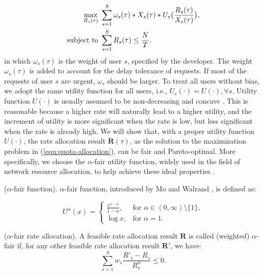\begin{align}\label{equ:quota-allocation}
\vspace{-0.5cm}
\max\limits_{R_s(\tau)}~ & \sum_{s=1}^{S} \omega_s(\tau)*X_s(\tau) * U_s\big(\frac{R_s(\tau)}{X_s(\tau)}\big),\nonumber\\
	\textrm{subject to } & \sum_{s=1}^{S}R_s(\tau) \le \frac{N}{T}.
	\end{align}
in which $\omega_s(\tau)$ is the weight of user $s$, specified by the developer. The weight $\omega_s(\tau)$ is added to account for the delay tolerance of requests. If most of the requests of user $s$ are urgent, $\omega_s$ should be larger. To treat all users without bias, we adopt the same utility function for all users, i.e., $U_s(\cdot) = U(\cdot), \forall s$. Utility function $U(\cdot)$ is usually assumed to be non-decreasing and concave \cite{yi2008stochastic}. This is reasonable because a higher rate will naturally lead to a higher utility, and the increment of utility is more significant when the rate is low, but less significant when the rate is already high. We will show that, with a proper utility function $U(\cdot)$, the rate allocation result $\pmb{R}(\tau)$, as the solution to the maximization problem in (\ref{equ:quota-allocation}), can be fair and Pareto-optimal. More specifically, we choose the $\alpha$-fair utility function, widely used in the field of network resource allocation, to help achieve these ideal properties \cite{yi2008stochastic}.
	
	\begin{definition} ($\alpha$-fair function). 
		$\alpha$-fair function, introduced by Mo and Walrand \cite{mo2000fair}, is defined as:

		
		\begin{equation}\label{equ:N_w_2}
		U^{\alpha}(x) = \left\{ \begin{array}{ll}
		\frac{x^{1-\alpha}}{1-\alpha}, &\textrm{for } \alpha \in (0,\infty) \setminus \{1\},   \\
		\log x, &\textrm{for } \alpha = 1. \end{array}  \right.
		\end{equation}
		 
	\end{definition} 
	
	\begin{definition}\label{def:fairallocation}($\alpha$-fair rate allocation). 
		A feasible rate allocation result $\pmb{R}$ is called (weighted) $\alpha$-fair if, for any other feasible rate allocation result $\pmb{R}'$, we have: 
		\begin{equation}
		\sum_{s=1}^{S} w_s\frac{R'_s - R_s}{R_s^{\alpha}} \le 0. 
		\end{equation}
	\end{definition}

